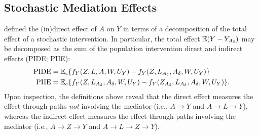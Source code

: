 
\subsection{Stochastic Mediation Effects}

\cite{diaz2020causal} defined the (in)direct effect of $A$ on $Y$ in
terms of a decomposition of the total effect of a stochastic
intervention. In particular, the total effect $\mathbb{E}(Y - Y_{A_\delta})$ may be
decomposed as the sum of the population intervention direct and indirect effects
(PIDE; PIIE):
\begin{align*}
  \text{PIDE} &= \mathbb{E}_c\{f_Y(Z, L, A, W,U_Y) -
                f_Y(Z, L_{A_\delta},A_\delta,W,U_Y)\}\\
  \text{PIIE} &= \mathbb{E}_c\{f_Y(Z, L_{A_\delta},A_\delta,W,U_Y) -
                f_Y(Z_{A_\delta},L_{A_\delta},A_\delta,W,U_Y)\}.
\end{align*}
Upon inspection, the definitions above reveal that the direct effect
measures the effect through paths \emph{not} involving the mediator
(i.e., $A \rightarrow Y$ and $A\rightarrow L \rightarrow Y$), whereas the
indirect effect measures the effect through paths involving the mediator
(i.e., $A\rightarrow Z \rightarrow Y$ and $A\rightarrow L \rightarrow Z
\rightarrow Y$).

